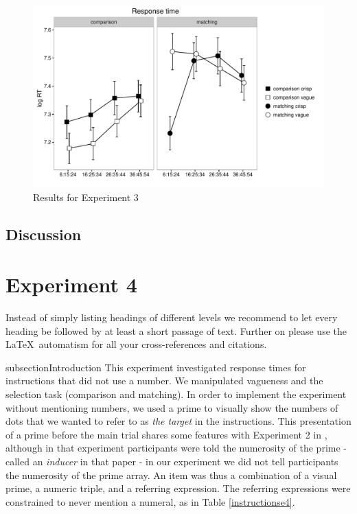 \documentclass[graybox,envcountchap,sectrefs%
,footinfo
]{svmono}
\begin{document}
\begin{figure}[htbp]
\centering
\includegraphics[width=.75\textwidth]{images/response-time-two-panels-1.pdf}
\caption{Results for Experiment 3}
\label{resultse3}
\end{figure}

\subsection{Discussion}
\textcolor{red}{\lipsum[1]}

\section{Experiment 4}
\label{sec:5}
Instead of simply listing headings of different levels we recommend to let every heading be followed by at least a short passage of text. Further on please use the \LaTeX\ automatism for all your cross-references and citations.

subsection{Introduction}
This experiment investigated response times for instructions that did not use a number. 
We manipulated vagueness and the selection task (comparison and matching). 
In order to implement the experiment without mentioning numbers,  we used a prime to visually show the numbers of dots that we wanted to refer to as {\em the target} in the instructions. 
This presentation of a prime before the main trial shares some features with Experiment 2 in \protect \citet{Izard20081221}, although in that experiment participants were told the numerosity of the prime - called an \emph{inducer} in that paper - in our experiment we did not tell participants the numerosity of the prime array.
An item was thus a combination of a visual prime, a numeric triple, and a referring expression.
The referring expressions were constrained to never mention a numeral, as in Table \ref{instructionse4}. 
\end{document}
